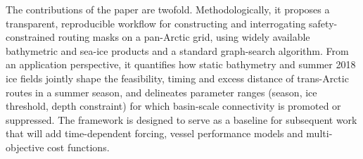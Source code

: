 The contributions of the paper are twofold. Methodologically, it proposes a transparent, reproducible workflow for constructing and interrogating safety-constrained routing masks on a pan-Arctic grid, using widely available bathymetric and sea-ice products and a standard graph-search algorithm. From an application perspective, it quantifies how static bathymetry and summer 2018 ice fields jointly shape the feasibility, timing and excess distance of trans-Arctic routes in a summer season, and delineates parameter ranges (season, ice threshold, depth constraint) for which basin-scale connectivity is promoted or suppressed. The framework is designed to serve as a baseline for subsequent work that will add time-dependent forcing, vessel performance models and multi-objective cost functions.